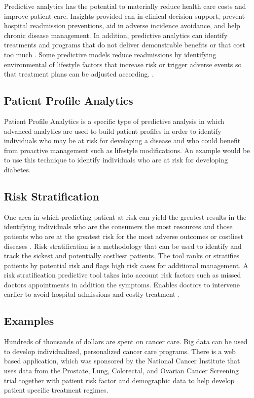 \documentclass[sigconf]{acmart}
\begin{document}
{{Predictive analytics has the potential to materially reduce health care costs and improve patient care.   Insights provided can in clinical decision support, prevent hospital readmission preventions, aid in adverse incidence avoidance, and help chronic disease management. In addition, predictive analytics can identify treatments and programs that do not deliver demonstrable benefits or that cost too much \cite{springer}. Some predictive models reduce readmissions by identifying environmental of lifestyle factors that increase risk or trigger adverse events so that treatment plans can be adjusted according. \cite{springer}. 

\subsection{Patient Profile Analytics}
Patient Profile Analytics is a specific type of predictive analysis in which advanced analytics are used to build patient profiles in order to identify individuals who may be at risk for developing a disease and who could benefit from proactive management such as lifestyle modifications. An example would be to use this technique to identify individuals who are at risk for developing diabetes. 

\subsection{Risk Stratification}
One area in which predicting patient at risk can yield the greatest results in the identifying individuals who are the consumers the most resources and those patients who are at the greatest risk for the most adverse outcomes or costliest diseases \cite{springer}. Risk stratification is a methodology that can be used to identify and track the sickest and potentially costliest patients. The tool ranks or stratifies patients by potential risk and flags high risk cases for additional management. A risk stratification predictive tool takes into account risk factors such as missed doctors appointments in addition the symptoms. Enables doctors to intervene earlier to avoid hospital admissions and costly treatment \cite{datafloq}. 
\subsection{Examples}  
Hundreds of thousands of dollars are spent on cancer care. Big data can be used to develop individualized, personalized cancer care programs. There is a web based application, which was sponsored by the National Cancer Institute that uses data from the Prostate, Lung, Colorectal, and Ovarian Cancer Screening trial together with patient risk factor and demographic data to help develop patient specific treatment regimes. 

}}
\end{document}
